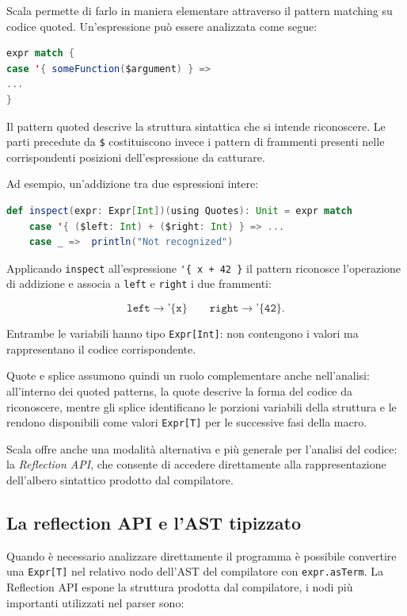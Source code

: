 \documentclass[a4paper,11pt]{report}
\theoremstyle{definition}
\begin{document}
Scala permette di farlo in maniera elementare attraverso il pattern matching su codice quoted. Un'espressione può essere analizzata come segue:

\begin{lstlisting}[language=Scala]
expr match {
case '{ someFunction($argument) } =>
...
}
\end{lstlisting}

Il pattern quoted descrive la struttura sintattica che si intende riconoscere. Le parti precedute da \verb|$| costituiscono invece i pattern di frammenti presenti nelle corrispondenti posizioni dell'espressione da catturare.

Ad esempio, un'addizione tra due espressioni intere:

\begin{lstlisting}[language=Scala]
def inspect(expr: Expr[Int])(using Quotes): Unit = expr match
    case '{ ($left: Int) + ($right: Int) } => ...
    case _ =>  println("Not recognized")
\end{lstlisting}

Applicando \texttt{inspect} all'espressione \verb|'{ x + 42 }| il pattern riconosce l'operazione di addizione e associa a \texttt{left} e \texttt{right} i due frammenti:

\[
  \texttt{left} \longrightarrow \texttt{'\{x\}}
  \qquad
  \texttt{right} \longrightarrow \texttt{'\{42\}}.
\]

Entrambe le variabili hanno tipo \verb|Expr[Int]|: non contengono i valori ma rappresentano il codice corrispondente.

Quote e splice assumono quindi un ruolo complementare anche nell'analisi: all'interno dei quoted patterns, la quote descrive la forma del codice da riconoscere, mentre gli splice identificano le porzioni variabili della struttura e le rendono disponibili come valori \verb|Expr[T]| per le successive fasi della macro.

Scala offre anche una modalità alternativa e più generale per l'analisi del codice: la \emph{Reflection API}, che consente di accedere direttamente alla rappresentazione dell'albero sintattico prodotto dal compilatore.

\subsection{La reflection API e l'AST tipizzato}
\label{sec:reflection}

Quando è necessario analizzare direttamente il programma è possibile convertire una \texttt{Expr[T]} nel relativo nodo dell'AST del compilatore con \texttt{expr.asTerm}. La Reflection API espone la struttura prodotta dal compilatore, i nodi più importanti utilizzati nel parser sono:
\end{document}
